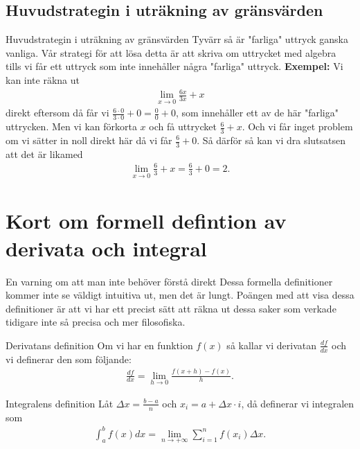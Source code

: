 \documentclass{beamer}
\begin{document}
\subsection*{Huvudstrategin i uträkning av gränsvärden}
\label{sec:org79f0086}
\begin{frame}{Huvudstrategin i uträkning av gränsvärden}
Tyvärr så är "farliga" uttryck ganska vanliga. Vår strategi för att lösa detta är
att skriva om uttrycket med algebra tills vi får ett uttryck som inte innehåller
några "farliga" uttryck.
\newline
\textbf{Exempel:}
Vi kan inte räkna ut
\begin{align*}
\lim_{ x \to 0 } \frac{6x}{3x} + x
\end{align*}
direkt eftersom då får vi \(\frac{6\cdot 0}{3\cdot 0} + 0 = \frac{0}{0} + 0\), som innehåller
ett av de här "farliga" uttrycken. Men vi kan förkorta \(x\) och få
uttrycket \(\frac{6}{3} + x\).
Och vi får inget problem om vi sätter in noll direkt här
då vi får \(\frac{6}{3} + 0\). Så därför så kan vi dra slutsatsen att det är likamed
\begin{align*}
\lim_{ x \to 0 } \frac{6}{3} + x = \frac{6}{3} + 0 = 2
.
\end{align*}
\end{frame}


\section*{Kort om formell defintion av derivata och integral}
\label{sec:org830abc5}
\begin{frame}{En varning om att man inte behöver förstå direkt}
Dessa formella definitioner kommer inte se väldigt intuitiva ut, men
det är lungt. Poängen med att visa dessa definitioner är att
vi har ett precist sätt att räkna ut dessa saker som verkade tidigare
inte så precisa och mer filosofiska.
\end{frame}

\begin{frame}{Derivatans definition}
Om vi har en funktion \(f(x)\) så kallar vi derivatan \(\frac{df}{dx}\) och vi
definerar den som följande:
\begin{align*}
\frac{df}{dx} = \lim_{ h \to 0 } \frac{f(x+h)-f(x)}{h}
.
\end{align*}
\end{frame}

\begin{frame}{Integralens definition}
Låt \(\Delta x = \frac{b-a}{n}\) och \(x_i = a + \Delta x \cdot i\), då definerar vi integralen som
\begin{align*}
\int_{ a }^{ b} f(x) dx = \lim_{ n \to +\infty } \sum_{ i = 1 }^{ n } f(x_i) \Delta x
.
\end{align*}
\end{frame}
\end{document}

